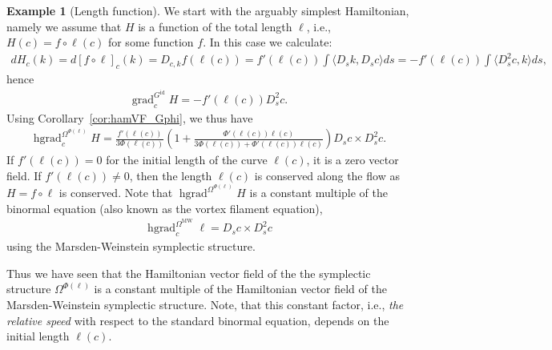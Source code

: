 \documentclass[12pt]{amsart}
\newcommand{\rev}[1]{#1}
\theoremstyle{definition}
\newtheorem{example}[theorem]{Example}
\newcommand{\id}{\mathrm{id}}
\newcommand{\OmMW}{\Omega^{\operatorname{MW}}}
\def\Om{\Omega}
\def\x{\times}
\let\on=\operatorname
\begin{document}
\begin{example}[Length function]
  We start with the arguably simplest Hamiltonian, namely  we assume that $H$ is a function of the total length $\ell$, i.e., \(H(c)=f\circ\ell(c)\) for some function \(f\). In this case we calculate:
\begin{align}
    dH_c (k)= d [f\circ\ell] _c(k) = D_{c,k}f(\rev{\ell(c)}) = f'(\rev{\ell(c)})\int \langle D_sk, D_sc\rangle ds=- f'(\rev{\ell(c)})\int \langle D^2_s c, k\rangle ds,
\end{align}
hence 
\begin{align}
    \on{grad}_c^{G^\id} H=-f'(\rev{\ell(c)})D^2_s c.
\end{align}
Using Corollary~\ref{cor:hamVF_Gphi}, we thus have
\begin{align}
    \on{hgrad}_c^{\Om^{\Phi(\ell)}} H = \frac{f'(\rev{\ell(c)})}{3\Phi(\rev{\ell(c)})}\left(1+ \frac{\Phi'(\rev{\ell(c)})\rev{\ell(c)}}{3\Phi(\rev{\ell(c)})+\Phi'(\rev{\ell(c)})\rev{\ell(c)}} \right)D_s c \x D^2_s c.
\end{align}
 If $f'(\rev{\ell(c)})=0$ for the initial length of the curve $\rev{\ell(c)}$, it is a zero vector field. If  $f'(\rev{\ell(c)})\neq 0$, then the length $\rev{\ell(c)}$ is conserved along the flow as $H=f\circ \ell$ is conserved. Note that  $\on{hgrad}^{\Om^{\Phi(\ell)}} H $ is a constant multiple of the binormal equation (also known as the vortex filament equation), 
\begin{align} \label{eq:binormal_equation}
    \on{hgrad}_c^{\OmMW}\ell=D_s c \x D^2_s c
\end{align}
using the Marsden-Weinstein symplectic structure.

 Thus we have seen that the Hamiltonian vector field of the the symplectic structure $\Om^{\Phi(\ell)}$ is a constant multiple of the Hamiltonian vector field of the Marsden-Weinstein symplectic structure. Note, that this constant factor, i.e., \emph{the relative speed} with respect to the standard binormal equation, depends on the initial length $\rev{\ell(c)}$.
\end{example}
\end{document}
